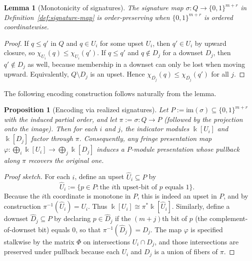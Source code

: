 \documentclass{article}
\newcommand{\kk}{\Bbbk}
\newcommand{\<}{\langle}
\renewcommand{\>}{\rangle}
\newtheorem*{proposition}{Proposition}
\newtheorem{lemma}[theorem]{Lemma}
\theoremstyle{definition}
\theoremstyle{remark}
\begin{document}
	\begin{lemma}[Monotonicity of signatures]
		\label{lem:signature-monotone}
		The signature map $\sigma\colon Q\to \{0,1\}^{m+r}$ in
		Definition~\ref{def:signature-map} is order-preserving when
		$\{0,1\}^{m+r}$ is ordered coordinatewise.
	\end{lemma}
	
	\begin{proof}
		If $q\le q'$ in $Q$ and $q\in U_i$ for some upset $U_i$, then $q'\in U_i$ by upward
		closure, so $\chi_{U_i}(q)\le \chi_{U_i}(q')$.
		If $q\le q'$ and $q\notin D_j$ for a downset $D_j$, then $q'\notin D_j$ as well,
		because membership in a downset can only be lost when moving upward.  Equivalently,
		$Q\setminus D_j$ is an upset.  Hence $\chi_{\overline{D_j}}(q)\le
		\chi_{\overline{D_j}}(q')$ for all $j$.
	\end{proof}
	
	The following encoding construction follows naturally from the lemma.
	
	\begin{proposition}[Encoding via realized signatures]
		\label{prop:encoding-by-signatures}
		Let $P:=\mathrm{im}(\sigma)\subseteq \{0,1\}^{m+r}$ with the induced partial order,
		and let $\pi:=\sigma\colon Q\to P$ (followed by the projection onto the image).
		Then for each $i$ and $j$, the indicator modules $\kk[U_i]$ and $\kk[D_j]$ factor
		through $\pi$.  Consequently, any fringe presentation map
		$\varphi\colon \bigoplus_i \kk[U_i]\to \bigoplus_j \kk[D_j]$ induces a
		$P$-module presentation whose pullback along $\pi$ recovers the original one.
	\end{proposition}
	
	\begin{proof}[Proof sketch]
		For each $i$, define an upset $\widehat{U}_i\subseteq P$ by
		\[
		\widehat{U}_i:=\{p\in P : \text{the $i$th upset-bit of $p$ equals }1\}.
		\]
		Because the $i$th coordinate is monotone in $P$, this is indeed an upset in $P$,
		and by construction $\pi^{-1}(\widehat{U}_i)=U_i$.
		Thus $\kk[U_i]\cong \pi^*\kk[\widehat{U}_i]$.
		Similarly, define a downset $\widehat{D}_j\subseteq P$ by declaring $p\in\widehat{D}_j$
		if the $(m+j)$th bit of $p$ (the complement-of-downset bit) equals $0$, so that
		$\pi^{-1}(\widehat{D}_j)=D_j$.
		The map $\varphi$ is specified stalkwise by the matrix $\Phi$ on intersections
		$U_i\cap D_j$, and those intersections are preserved under pullback because each
		$U_i$ and $D_j$ is a union of fibers of $\pi$.
	\end{proof}
	
\end{document}
